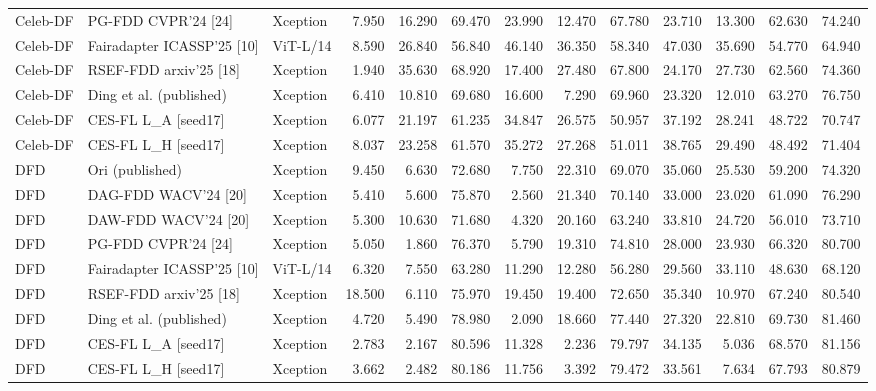 \begin{table}[t]
{\begin{tabular}{lllrrrrrrrrrr}
Celeb-DF & PG-FDD CVPR’24 [24] & Xception & 7.950 & 16.290 & 69.470 & 23.990 & 12.470 & 67.780 & 23.710 & 13.300 & 62.630 & 74.240 \\
Celeb-DF & Fairadapter ICASSP’25 [10] & ViT-L/14 & 8.590 & 26.840 & 56.840 & 46.140 & 36.350 & 58.340 & 47.030 & 35.690 & 54.770 & 64.940 \\
Celeb-DF & RSEF-FDD arxiv’25 [18] & Xception & 1.940 & 35.630 & 68.920 & 17.400 & 27.480 & 67.800 & 24.170 & 27.730 & 62.560 & 74.360 \\
Celeb-DF & Ding et al. (published) & Xception & 6.410 & 10.810 & 69.680 & 16.600 & 7.290 & 69.960 & 23.320 & 12.010 & 63.270 & 76.750 \\
Celeb-DF & CES-FL L\_A [seed17] & Xception & 6.077 & 21.197 & 61.235 & 34.847 & 26.575 & 50.957 & 37.192 & 28.241 & 48.722 & 70.747 \\
Celeb-DF & CES-FL L\_H [seed17] & Xception & 8.037 & 23.258 & 61.570 & 35.272 & 27.268 & 51.011 & 38.765 & 29.490 & 48.492 & 71.404 \\
DFD & Ori (published) & Xception & 9.450 & 6.630 & 72.680 & 7.750 & 22.310 & 69.070 & 35.060 & 25.530 & 59.200 & 74.320 \\
DFD & DAG-FDD WACV’24 [20] & Xception & 5.410 & 5.600 & 75.870 & 2.560 & 21.340 & 70.140 & 33.000 & 23.020 & 61.090 & 76.290 \\
DFD & DAW-FDD WACV’24 [20] & Xception & 5.300 & 10.630 & 71.680 & 4.320 & 20.160 & 63.240 & 33.810 & 24.720 & 56.010 & 73.710 \\
DFD & PG-FDD CVPR’24 [24] & Xception & 5.050 & 1.860 & 76.370 & 5.790 & 19.310 & 74.810 & 28.000 & 23.930 & 66.320 & 80.700 \\
DFD & Fairadapter ICASSP’25 [10] & ViT-L/14 & 6.320 & 7.550 & 63.280 & 11.290 & 12.280 & 56.280 & 29.560 & 33.110 & 48.630 & 68.120 \\
DFD & RSEF-FDD arxiv’25 [18] & Xception & 18.500 & 6.110 & 75.970 & 19.450 & 19.400 & 72.650 & 35.340 & 10.970 & 67.240 & 80.540 \\
DFD & Ding et al. (published) & Xception & 4.720 & 5.490 & 78.980 & 2.090 & 18.660 & 77.440 & 27.320 & 22.810 & 69.730 & 81.460 \\
DFD & CES-FL L\_A [seed17] & Xception & 2.783 & 2.167 & 80.596 & 11.328 & 2.236 & 79.797 & 34.135 & 5.036 & 68.570 & 81.156 \\
DFD & CES-FL L\_H [seed17] & Xception & 3.662 & 2.482 & 80.186 & 11.756 & 3.392 & 79.472 & 33.561 & 7.634 & 67.793 & 80.879 \\
\bottomrule
\end{tabular}}
\end{table}

